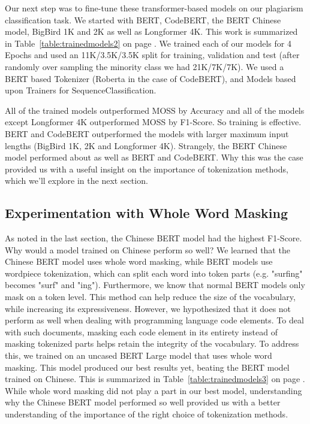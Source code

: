 \documentclass[twocolumn]{article}
\begin{document}
Our next step was to fine-tune these transformer-based models on our plagiarism classification task. We started with BERT, CodeBERT, the BERT Chinese model, BigBird 1K and 2K as well as Longformer 4K. This work is summarized in Table~\ref{table:trainedmodels2} on page \pageref{table:trainedmodels2}. We trained each of our models for 4 Epochs and used an 11K/3.5K/3.5K split for training, validation and test  (after randomly over sampling the minority class we had 21K/7K/7K). 
We used a BERT based Tokenizer (Roberta in the case of CodeBERT), and Models based upon Trainers for SequenceClassification. 

All of the trained models outperformed MOSS by Accuracy and all of the models except Longformer 4K outperformed MOSS by F1-Score. So training is effective. BERT and CodeBERT outperformed the models with larger maximum input lengths (BigBird 1K, 2K and Longformer 4K). Strangely, the BERT Chinese model performed about as well as BERT and CodeBERT. Why this was the case provided us with a useful insight on the importance of tokenization methods, which we'll explore in the next section. 


\subsection{\normalsize Experimentation with Whole Word Masking}

As noted in the last section, the Chinese BERT model had the highest F1-Score. Why would a model trained on Chinese perform so well? We learned that the Chinese BERT model uses whole word masking, while BERT models use wordpiece tokenization, which can split each word into token parts (e.g. "surfing" becomes "surf" and "ing"). Furthermore, we know that normal BERT models only mask on a token level. This method can help reduce the size of the vocabulary, while increasing its expressiveness.  However, we hypothesized that it does not perform as well when dealing with programming language code elements. To deal with such documents, masking each code element in its entirety instead of masking tokenized parts helps retain the integrity of the vocabulary. To address this, we trained on an uncased BERT Large model that uses whole word masking. This model produced our best results yet, beating the BERT model trained on Chinese. This is summarized in Table~\ref{table:trainedmodels3} on page \pageref{table:trainedmodels3}. While whole word masking did not play a part in our best model, understanding why the Chinese BERT model performed so well provided us with a better understanding of the importance of the right choice of tokenization methods. 
\end{document}
